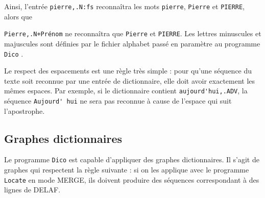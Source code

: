 \bigskip
\noindent Ainsi, l’entrée \verb$pierre,.N:fs$ reconnaîtra les mots \verb+pierre+,
\verb+Pierre+ et \verb+PIERRE+, alors que

\noindent \verb$Pierre,.N+Prénom$ ne reconnaîtra que \verb+Pierre+ et \verb+PIERRE+. Les lettres
minuscules et majuscules sont définies par le fichier alphabet passé en paramètre au programme
\verb+Dico+
.

\bigskip
\noindent Le respect des espacements est une règle très simple : pour qu’une séquence du texte
soit reconnue par une entrée de dictionnaire, elle doit avoir exactement les mêmes espaces.
Par exemple, si le dictionnaire contient \verb+aujourd'hui,.ADV+, la séquence \verb+Aujourd' hui+
ne sera pas reconnue à cause de l’espace qui suit l’apostrophe.


\subsection{Graphes dictionnaires}
\label{section-dictionary-graphs}
Le programme \verb+Dico+ est capable
d’appliquer des graphes dictionnaires. Il s’agit de graphes qui respectent la règle suivante :
si on les applique avec le programme \verb+Locate+ en mode MERGE, ils doivent produire des séquences
correspondant à des lignes de DELAF.

